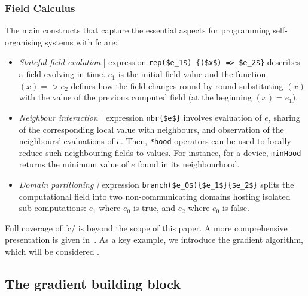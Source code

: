 \subsubsection{Field Calculus} The main constructs that capture the essential aspects for programming self-organising systems with \ac{fc} are:
\begin{itemize}
  \item \textit{Stateful field evolution} | expression \lstinline[mathescape]!rep($e_1$) {($x$) => $e_2$}! describes a field evolving in time. 
  $e_1$ is the initial field value and the function $(x) => e_2$ defines how the field changes round by round substituting $(x)$ with the value of the previous computed field (at the beginning $(x) = e_1$).
%
  \item \textit{Neighbour interaction} | expression \lstinline[mathescape]!nbr{$e$}!  
  involves evaluation of $e$, sharing of the corresponding local value with neighbours, and observation of the neighbours' evaluations of $e$. Then, \lstinline|*hood| operators can be used to locally reduce such neighbouring fields to values.
  For instance, for a device, \lstinline!minHood! returns the minimum value of $e$ found in its neighbourhood.
%  
  \item \textit{Domain partitioning |} expression \lstinline[mathescape]!branch($e_0$){$e_1$}{$e_2$}! splits the computational
  field into two non-communicating domains hosting isolated sub-computations:
  $e_1$ where $e_0$ is true, and $e_2$ where $e_0$ is false.
\end{itemize}
%
Full coverage of \ac{fc}/\scafi{} is beyond the scope of this paper. A more comprehensive presentation is given in~\cite{DBLP:journals/jlap/ViroliBDACP19}. 
%
As a key example, we introduce the gradient algorithm, which will be considered .

\subsection{The gradient building block}\label{sec:gradient}

